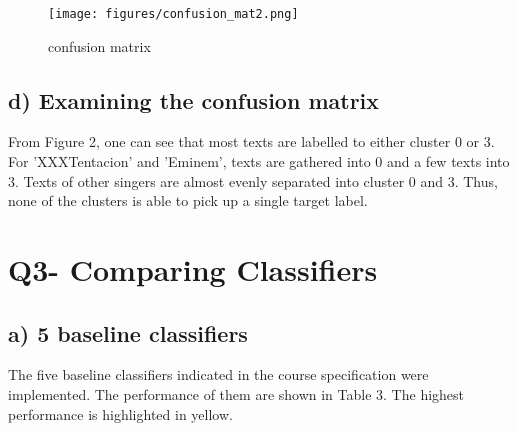 \documentclass[a4paper,11pt]{article}
\begin{document}
\begin{figure}[htbp]
  \begin{center}
  \texttt{[image: figures/confusion\_mat2.png]}
  \caption{confusion matrix}
  \end{center}
\end{figure}
\subsection{d) Examining the confusion matrix}
From Figure 2, one can see that most texts are labelled to either cluster 0 or 3. 
For 'XXXTentacion' and 'Eminem', texts are gathered into 0 and a few texts into 3.
Texts of other singers are almost evenly separated into cluster 0 and 3.
Thus, none of the clusters is able to pick up a single target label.



\section{Q3- Comparing Classifiers}
\subsection{a) 5 baseline classifiers}
The five baseline classifiers indicated in the course specification were implemented.
The performance of them are shown in Table 3.
The highest performance is highlighted in yellow.
\end{document}
